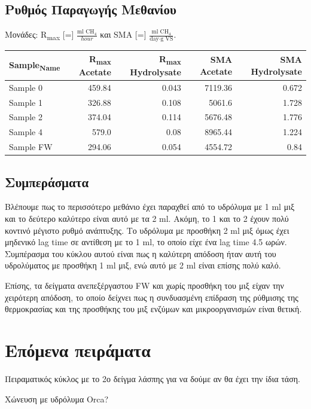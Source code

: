 \documentclass[11pt]{article}
\begin{document}
\subsection{Ρυθμός Παραγωγής Μεθανίου}
\label{sec:orga5eac0c}
Μονάδες: R\textsubscript{max} [=] \(\frac{\text{ml CH$_4$}}{hour}\) και SMA [=] \(\frac{\text{ml CH$_4$}}{\text{day} \cdot \text{g VS}}\).

\begin{center}
\begin{tabular}{lrrrr}
Sample\textsubscript{Name} & R\textsubscript{max} Acetate & R\textsubscript{max} Hydrolysate & SMA Acetate & SMA Hydrolysate\\[0pt]
\hline
Sample 0 & 459.84 & 0.043 & 7119.36 & 0.672\\[0pt]
Sample 1 & 326.88 & 0.108 & 5061.6 & 1.728\\[0pt]
Sample 2 & 374.04 & 0.114 & 5676.48 & 1.776\\[0pt]
Sample 4 & 579.0 & 0.08 & 8965.44 & 1.224\\[0pt]
Sample FW & 294.06 & 0.054 & 4554.72 & 0.84\\[0pt]
\end{tabular}
\end{center}

\subsection{Συμπεράσματα}
\label{sec:org01b2a23}
Βλέπουμε πως το περισσότερο μεθάνιο έχει παραχθεί από το υδρόλυμα με 1 ml μιξ και το δεύτερο καλύτερο είναι αυτό με τα 2 ml. Ακόμη, το 1 και το 2 έχουν πολύ κοντινό μέγιστο ρυθμό ανάπτυξης. Το υδρόλυμα με προσθήκη 2 ml μιξ όμως έχει μηδενικό lag time σε αντίθεση με το 1 ml, το οποίο είχε ένα lag time 4.5 ωρών. Συμπέρασμα του κύκλου αυτού είναι πως η καλύτερη απόδοση ήταν αυτή του υδρολύματος με προσθήκη 1 ml μιξ, ενώ αυτό με 2 ml είναι επίσης πολύ καλό.

Επίσης, τα δείγματα ανεπεξέργαστου FW και χωρίς προσθήκη του μιξ είχαν την χειρότερη απόδοση, το οποίο δείχνει πως η συνδυασμένη επίδραση της ρύθμισης της θερμοκρασίας και της προσθήκης του μιξ ενζύμων και μικροοργανισμών είναι θετική.

\section{Επόμενα πειράματα}
\label{sec:org46dc9b2}
Πειραματικός κύκλος με το 2ο δείγμα λάσπης για να δούμε αν θα έχει την ίδια τάση.

Χώνευση με υδρόλυμα Orca?
\end{document}

